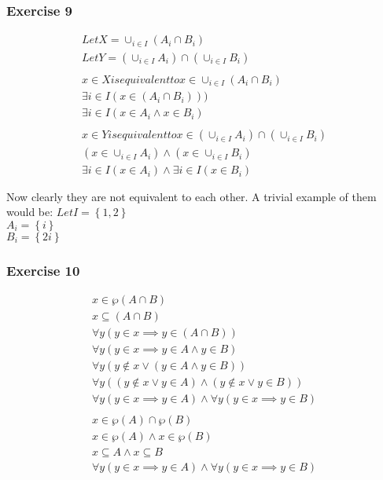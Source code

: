 \begin{questions}
\subsubsection{Exercise 9}
\begin{align*}
  Let X = \cup_{i \in I} (A_i \cap B_i) \\
  Let Y = (\cup_{i \in I}A_i) \cap (\cup_{i \in  I} B_i) \\ \\
  x \in X is equivalent to x \in \cup_{i \in I} (A_i \cap B_i) \\
  \exists i \in I(x \in (A_i \cap B_i))) \\
  \exists i \in I(x \in A_i \land x \in B_i) \\ \\
  x \in Y is equivalent to x \in (\cup_{i \in I}A_i) \cap (\cup_{i \in  I} B_i) \\
  (x \in \cup_{i \in I}A_i) \land (x \in \cup_{i \in  I} B_i) \\
  \exists i \in I(x \in A_i) \land \exists i \in I (x \in B_i) \\ \\
\end{align*}
Now clearly they are not equivalent to each other. A trivial example of them would be:
$Let I = \left\{1,2\right\}$ \\
$A_i = \left\{i\right\}$ \\
$B_i = \left\{2i\right\}$ \\

\subsubsection{Exercise 10}
\begin{align*}
  x \in \wp(A \cap B) \\
  x \subseteq (A \cap B) \\
  \forall y (y \in x \implies y \in (A \cap B)) \\
  \forall y (y \in x \implies y \in A \land y \in B) \\
  \forall y (y \notin x \lor (y \in A \land y \in B)) \\
  \forall y ((y \notin x \lor y \in A) \land (y \notin x \lor y \in B)) \\
  \forall y(y \in x \implies y \in A) \land \forall y(y \in x \implies y \in B) \\ \\
  x \in \wp(A) \cap \wp(B) \\
  x \in \wp(A) \land x \in \wp(B) \\
  x \subseteq A \land x \subseteq B \\
  \forall y(y \in x \implies y \in A) \land \forall y(y \in x \implies y \in B) \\
\end{align*}

\end{questions}

